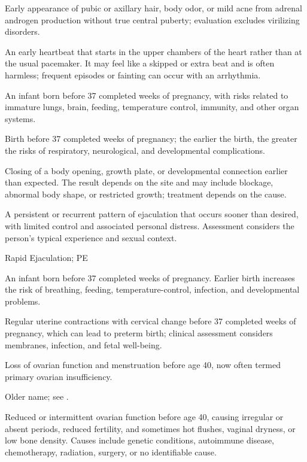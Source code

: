  Early appearance of pubic or axillary hair, body odor, or mild acne from adrenal androgen production without true central puberty; evaluation excludes virilizing disorders.

 An early heartbeat that starts in the upper chambers of the heart rather than at the usual pacemaker. It may feel like a skipped or extra beat and is often harmless; frequent episodes or fainting can occur with an arrhythmia.

 An infant born before 37 completed weeks of pregnancy, with risks related to immature lungs, brain, feeding, temperature control, immunity, and other organ systems.

 Birth before 37 completed weeks of pregnancy; the earlier the birth, the greater the risks of respiratory, neurological, and developmental complications.

 Closing of a body opening, growth plate, or developmental connection earlier than expected. The result depends on the site and may include blockage, abnormal body shape, or restricted growth; treatment depends on the cause.

 A persistent or recurrent pattern of ejaculation that occurs sooner than desired,
with limited control and associated personal distress. Assessment considers the person's typical experience and sexual
context.

\synonyms
Rapid Ejaculation; PE

 An infant born before 37 completed weeks of pregnancy. Earlier birth increases the risk of breathing, feeding, temperature-control, infection, and developmental problems.

 Regular uterine contractions with cervical change before 37 completed weeks of pregnancy, which can lead to preterm birth; clinical assessment considers membranes, infection, and fetal well-being.

 Loss of ovarian function and menstruation before age 40, now often termed primary ovarian insufficiency.

 Older name; see .

 Reduced or intermittent ovarian function before age 40, causing irregular or absent periods, reduced fertility, and sometimes hot flushes, vaginal dryness, or low bone density. Causes include genetic conditions, autoimmune disease, chemotherapy, radiation, surgery, or no identifiable cause.

